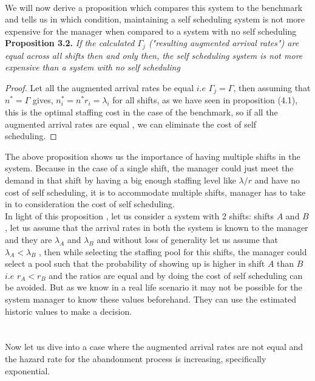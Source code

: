 \\ We will now derive a proposition which compares this system to the benchmark and tells us in which condition, maintaining a self scheduling system is not more expensive for the manager when compared to a system with no self scheduling 
\\ \textbf{Proposition 3.2.} \textit{If the calculated $\Gamma_j$ ("resulting augmented arrival rates") are equal across all shifts then and only then, the self scheduling system is not more expensive than a system with no self scheduling}
\begin{proof} \label{}
Let all the augmented arrival rates be equal $i.e$ $\Gamma_j=\Gamma$, then assuming that $n^{*}=\Gamma$ gives, $n_i^{*}=n^{*}r_i=\lambda_i$ for all shifts, as we have seen in proposition (4.1), this is the optimal staffing cost in the case of the benchmark, so if all the augmented arrival rates are equal , we can eliminate the cost of self scheduling. 
\end{proof}
The above proposition shows us the importance of having multiple shifts in the system. Because in the case of a single shift, the manager could just meet the demand in that shift by having a big enough staffing level like $\lambda/r$ and have no cost of self scheduling, it is to accommodate multiple shifts, manager has to take in to consideration the cost of self scheduling. 
\\In light of this proposition , let us consider a system with 2 shifts: shifts $A$ and $B$, let us assume that the arrival rates in both the system is known to the manager and they are $\lambda_A$ and $\lambda_B$ and without loss of generality let us assume that $\lambda_A<\lambda_B$ , then while selecting the staffing pool for this shifts, the manager could select a pool such that the probability of showing up is higher in shift $A$ than $B$ $i.e$ $r_A < r_B$ and the ratios are equal and by doing the cost of self scheduling can be avoided. But as we know in a real life scenario it may not be possible for the system manager to know these values beforehand. They can use the estimated historic values to make a decision.
\\
\\
\\ Now let us dive into a case where the augmented arrival rates are not equal and the hazard rate for the abandonment process is increasing, specifically exponential.
